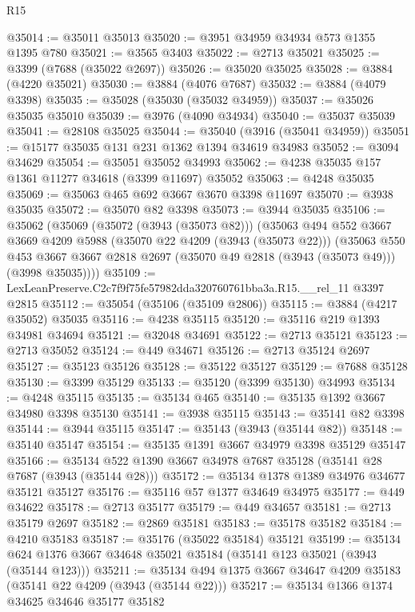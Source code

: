 \begin{lexlean}{R15}
\begin{coremodule}
@35014 := @35011 @35013
@35020 := @3951 @34959 @34934 @573 @1355 @1395 @780
@35021 := @3565 @3403
@35022 := @2713 @35021
@35025 := @3399 (@7688 (@35022 @2697))
@35026 := @35020 @35025
@35028 := @3884 (@4220 @35021)
@35030 := @3884 (@4076 @7687)
@35032 := @3884 (@4079 @3398)
@35035 := @35028 (@35030 (@35032 @34959))
@35037 := @35026 @35035 @35010
@35039 := @3976 (@4090 @34934)
@35040 := @35037 @35039
@35041 := @28108 @35025
@35044 := @35040 (@3916 (@35041 @34959))
@35051 := @15177 @35035 @131 @231 @1362 @1394 @34619 @34983
@35052 := @3094 @34629
@35054 := @35051 @35052 @34993
@35062 := @4238 @35035 @157 @1361 @11277 @34618 (@3399 @11697) @35052
@35063 := @4248 @35035
@35069 := @35063 @465 @692 @3667 @3670 @3398 @11697
@35070 := @3938 @35035
@35072 := @35070 @82 @3398
@35073 := @3944 @35035
@35106 := @35062
    (@35069
      (@35072 (@3943 (@35073 @82)))
      (@35063
        @494
        @552
        @3667
        @3669
        @4209
        @5988
        (@35070 @22 @4209 (@3943 (@35073 @22)))
        (@35063
          @550
          @453
          @3667
          @3667
          @2818
          @2697
          (@35070 @49 @2818 (@3943 (@35073 @49)))
          (@3998 @35035))))
@35109 := LexLeanPreserve.C2c7f9f75fe57982dda320760761bba3a.R15.__rel_11 @3397 @2815
@35112 := @35054 (@35106 (@35109 @2806))
@35115 := @3884 (@4217 @35052) @35035
@35116 := @4238 @35115
@35120 := @35116 @219 @1393 @34981 @34694
@35121 := @32048 @34691
@35122 := @2713 @35121
@35123 := @2713 @35052
@35124 := @449 @34671
@35126 := @2713 @35124 @2697
@35127 := @35123 @35126
@35128 := @35122 @35127
@35129 := @7688 @35128
@35130 := @3399 @35129
@35133 := @35120 (@3399 @35130) @34993
@35134 := @4248 @35115
@35135 := @35134 @465
@35140 := @35135 @1392 @3667 @34980 @3398 @35130
@35141 := @3938 @35115
@35143 := @35141 @82 @3398
@35144 := @3944 @35115
@35147 := @35143 (@3943 (@35144 @82))
@35148 := @35140 @35147
@35154 := @35135 @1391 @3667 @34979 @3398 @35129 @35147
@35166 := @35134 @522 @1390 @3667 @34978 @7687 @35128 (@35141 @28 @7687 (@3943 (@35144 @28)))
@35172 := @35134 @1378 @1389 @34976 @34677 @35121 @35127
@35176 := @35116 @57 @1377 @34649 @34975
@35177 := @449 @34622
@35178 := @2713 @35177
@35179 := @449 @34657
@35181 := @2713 @35179 @2697
@35182 := @2869 @35181
@35183 := @35178 @35182
@35184 := @4210 @35183
@35187 := @35176 (@35022 @35184) @35121
@35199 := @35134 @624 @1376 @3667 @34648 @35021 @35184 (@35141 @123 @35021 (@3943 (@35144 @123)))
@35211 := @35134 @494 @1375 @3667 @34647 @4209 @35183 (@35141 @22 @4209 (@3943 (@35144 @22)))
@35217 := @35134 @1366 @1374 @34625 @34646 @35177 @35182

\end{coremodule}
\end{lexlean}
